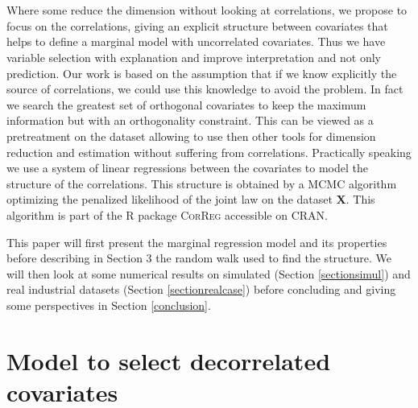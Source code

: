 \documentclass[11pt,a4paper]{article}
\begin{document}
	~\\	~\\

 Where some reduce the dimension without looking at correlations,  we propose to focus on the correlations, giving an explicit structure between covariates that helps to define a marginal model with uncorrelated covariates. Thus we have variable selection with explanation and improve interpretation and not only prediction.
 Our work is based on the assumption that if we know explicitly the source of correlations, we could use this knowledge to avoid the problem.
 In fact we search the greatest set of orthogonal covariates to keep the maximum information but with an orthogonality constraint. This can be viewed as a pretreatment on the dataset allowing to use then other tools for dimension reduction and estimation without suffering from correlations. Practically speaking we use a system of linear regressions between the covariates to model the structure of the correlations. This structure is obtained by a MCMC algorithm optimizing the penalized likelihood of the joint law on the dataset $\boldsymbol{X}$. This algorithm is part of the R package \textsc{CorReg} accessible on \textsc{CRAN}. %
 
	
 	
 	This paper will first present the marginal regression model and its properties before describing in Section 3 the random walk used to find the structure.
 	We will then look at some numerical results on simulated (Section \ref{sectionsimul}) and real industrial datasets (Section \ref{sectionrealcase}) before concluding and giving some perspectives in Section \ref{conclusion}.
	
\section{Model to select decorrelated covariates}
\end{document}
